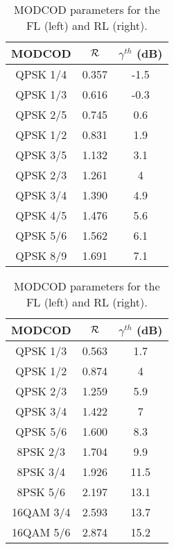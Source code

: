 \documentclass[journal,onecolumn,10pt,a4paper]{IEEEtran}
\begin{document}
\begin{table}
  \caption{MODCOD parameters for the FL (left) and RL (right).}
  \label{tbl:modcod}


  \centering
  \begin{tabular}{|c | c | c |} \hline
MODCOD & ${\cal R}$ & ${\gamma}^{th}$ (dB) \\ \hline \hline
QPSK 1/4 & 0.357 & -1.5 \\ \hline
QPSK 1/3 & 0.616 & -0.3 \\ \hline
QPSK 2/5 & 0.745 & 0.6 \\ \hline
QPSK 1/2 & 0.831 & 1.9 \\ \hline
QPSK 3/5 & 1.132 & 3.1 \\ \hline
QPSK 2/3 & 1.261 & 4 \\ \hline
QPSK 3/4 & 1.390 & 4.9 \\ \hline
QPSK 4/5 & 1.476 & 5.6 \\ \hline
QPSK 5/6 & 1.562 & 6.1 \\ \hline
QPSK 8/9 & 1.691 & 7.1 \\ \hline
  \end{tabular}\hspace*{1cm} 
  \begin{tabular}{|c | c | c |} \hline
MODCOD & ${\cal R}$ & ${\gamma}^{th}$ (dB) \\ \hline \hline
QPSK 1/3 & 0.563 & 1.7\\ \hline
QPSK 1/2 & 0.874 & 4\\ \hline
QPSK 2/3 & 1.259 & 5.9\\ \hline
QPSK 3/4 & 1.422 & 7 \\ \hline
QPSK 5/6 & 1.600 & 8.3 \\ \hline
8PSK 2/3 & 1.704 & 9.9\\ \hline
8PSK 3/4 & 1.926 & 11.5\\ \hline
8PSK 5/6 & 2.197 & 13.1\\ \hline
16QAM 3/4 & 2.593 & 13.7 \\ \hline
16QAM 5/6 & 2.874 & 15.2\\ \hline
  \end{tabular}
\end{table}
 
\end{document}
